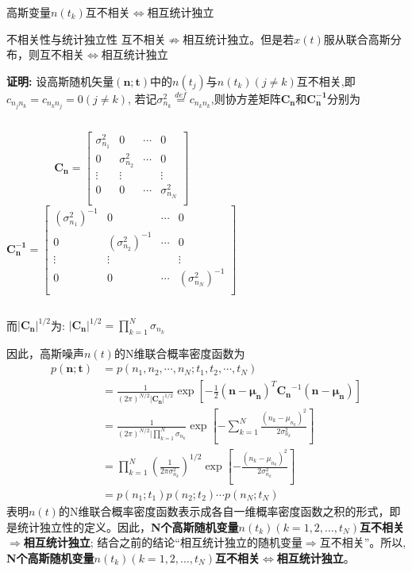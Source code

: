 \begin{frame}{高斯变量$n(t_k)$互不相关$\Leftrightarrow$相互统计独立}
	\begin{block}{不相关性与统计独立性}
		互不相关$\nRightarrow$相互统计独立。但是若$x(t)$服从联合高斯分布，则互不相关$\Leftrightarrow$相互统计独立
	\end{block}
\textbf{证明:} 设高斯随机矢量$\bm{(n;t)}$中的$n(t_j)$与$n(t_k)(j\ne k)$互不相关,即$c_{n_jn_k}=c_{n_kn_j}=0(j\ne k)$, 若记$\sigma_{n_k}^2\mathop{=}\limits^{def}c_{n_kn_k}$,则协方差矩阵$\bm{C_n}$和$\bm{C_n^{-1}}$分别为
	\begin{columns}
		$$
		\bm{C_n}=\left[
		\begin{matrix}
		\sigma_{n_1}^2 &  0                 & \cdots & 0\\
		0              &  \sigma_{n_2}^2  & \cdots & 0\\
		\vdots         &  \vdots            &        &\vdots \\
		0              &  0                 & \cdots &\sigma_{n_N}^2\\
		\end{matrix}
		\right]
		$$
		$$\bm{C_n^{-1}}=\left[
		\begin{matrix}
		(\sigma_{n_1}^2)^{-1} &  0                 & \cdots & 0\\
		0              &  (\sigma_{n_2}^2)^{-1}  & \cdots & 0\\
		\vdots         &  \vdots            &        &\vdots \\
		0              &  0                 & \cdots &(\sigma_{n_N}^2)^{-1}\\
		\end{matrix}
		\right]
		$$
	\end{columns}
	而$|\bm{C_n}|^{1/2}$为: $|\bm{C_n}|^{1/2}=\prod\limits_{k=1}^{N}\sigma_{n_k}$
\end{frame}

\begin{frame}
	因此，高斯噪声$n(t)$的N维联合概率密度函数为
	\begin{align*}
	p(\bm{n;t})&=p(n_1,n_2,\cdots,n_N; t_1,t_2,\cdots,t_N)\\
	&=\frac{1}{(2\pi)^{N/2}|\bm{C_n}|^{1/2}}\exp\left[-\frac{1}{2}(\bm{n-\mu_n})^T\bm{C_n}^{-1}(\bm{n-\mu_n})\right]\\
	&=\frac{1}{(2\pi)^{N/2}|\prod\limits_{k=1}^{N}\sigma_{n_k}}\exp\left[-\sum\limits_{k=1}^{N}\frac{(n_k-\mu_{n_k})^2}{2\sigma_{n_k}^2}\right]\\
	&=\prod\limits_{k=1}^{N}\left(\frac{1}{2\pi\sigma_{n_k}^2}\right)^{1/2}\exp\left[-\frac{(n_k-\mu_{n_k})^2}{2\sigma_{n_k}^2}\right]\\
	&=p(n_1;t_1)p(n_2;t_2)\cdots p(n_N;t_N)
	\end{align*}
	表明$n(t)$的N维联合概率密度函数表示成各自一维概率密度函数之积的形式，即是统计独立性的定义。因此，\textbf{N个高斯随机变量$n(t_k)(k=1,2,\dots,t_N)$互不相关$\Rightarrow$相互统计独立}; 结合之前的结论``相互统计独立的随机变量$\Rightarrow$互不相关''。所以, \textbf{
	N个高斯随机变量$n(t_k)(k=1,2,\dots,t_N)$互不相关$\Leftrightarrow$相互统计独立}。
\end{frame}

